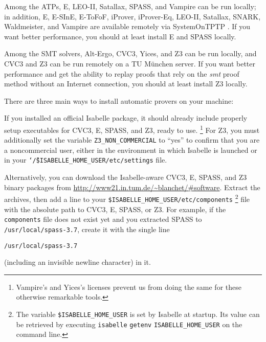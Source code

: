 \documentclass[a4paper,12pt]{article}
\newcommand\download{\url{http://www21.in.tum.de/~blanchet/\#software}}
\begin{document}
Among the ATPs, E, LEO-II, Satallax, SPASS, and Vampire can be run locally; in
addition, E, E-SInE, E-ToFoF, iProver, iProver-Eq, LEO-II, Satallax, SNARK,
Waldmeister, and Vampire are available remotely via System\-On\-TPTP
\cite{sutcliffe-2000}. If you want better performance, you should at least
install E and SPASS locally.

Among the SMT solvers, Alt-Ergo, CVC3, Yices, and Z3 can be run locally, and
CVC3 and Z3 can be run remotely on a TU M\"unchen server. If you want better
performance and get the ability to replay proofs that rely on the \emph{smt}
proof method without an Internet connection, you should at least install Z3
locally.

There are three main ways to install automatic provers on your machine:

\begin{sloppy}
\begin{enum}
\item[\labelitemi] If you installed an official Isabelle package, it should
already include properly setup executables for CVC3, E, SPASS, and Z3, ready to use.%
\footnote{Vampire's and Yices's licenses prevent us from doing the same for
these otherwise remarkable tools.}
For Z3, you must additionally set the variable
\texttt{Z3\_NON\_COMMERCIAL} to ``yes'' to confirm that you are a
noncommercial user, either in the environment in which Isabelle is
launched or in your
\texttt{\char`\~/\$ISABELLE\_HOME\_USER/etc/settings} file.

\item[\labelitemi] Alternatively, you can download the Isabelle-aware CVC3, E,
SPASS, and Z3 binary packages from \download. Extract the archives, then add a
line to your \texttt{\$ISABELLE\_HOME\_USER\slash etc\slash components}%
\footnote{The variable \texttt{\$ISABELLE\_HOME\_USER} is set by Isabelle at
startup. Its value can be retrieved by executing \texttt{isabelle}
\texttt{getenv} \texttt{ISABELLE\_HOME\_USER} on the command line.}
file with the absolute path to CVC3, E, SPASS, or Z3. For example, if the
\texttt{components} file does not exist yet and you extracted SPASS to
\texttt{/usr/local/spass-3.7}, create it with the single line

\prew
\texttt{/usr/local/spass-3.7}
\postw

(including an invisible newline character) in it.


\end{enum}
\end{sloppy}
\end{document}
